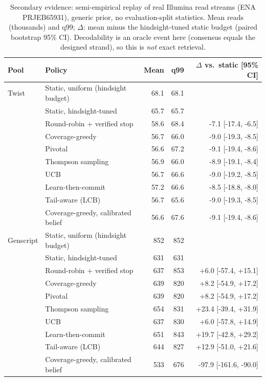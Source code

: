 \begin{table}[!t]
\centering
\caption{Secondary evidence: semi-empirical replay of real Illumina read streams (ENA PRJEB65931), generic prior, no evaluation-split statistics.  Mean reads (thousands) and q99; $\Delta$: mean minus the hindsight-tuned static budget (paired bootstrap 95\% CI).  Decodability is an oracle event here (consensus equals the designed strand), so this is \emph{not} exact retrieval.}
\label{tab:replay}
\scriptsize
\setlength{\tabcolsep}{2.5pt}
\begin{tabular}{@{}llrrr@{}}
\toprule
Pool & Policy & Mean & q99 & $\Delta$ vs.\ static [95\% CI] \\
\midrule
Twist & Static, uniform (hindsight budget) & 68.1 & 68.1 &  \\
 & Static, hindsight-tuned & 65.7 & 65.7 &  \\
 & Round-robin + verified stop & 58.6 & 68.4 & -7.1 [-17.4, -6.5] \\
 & Coverage-greedy & 56.7 & 66.0 & -9.0 [-19.3, -8.5] \\
 & Pivotal & 56.6 & 67.2 & -9.1 [-19.4, -8.6] \\
 & Thompson sampling & 56.9 & 66.0 & -8.9 [-19.1, -8.4] \\
 & UCB & 56.7 & 66.6 & -9.0 [-19.2, -8.5] \\
 & Learn-then-commit & 57.2 & 66.6 & -8.5 [-18.8, -8.0] \\
 & Tail-aware (LCB) & 56.7 & 65.6 & -9.0 [-19.3, -8.5] \\
 & Coverage-greedy, calibrated belief & 56.6 & 67.6 & -9.1 [-19.4, -8.6] \\
\midrule
Genscript & Static, uniform (hindsight budget) & 852 & 852 &  \\
 & Static, hindsight-tuned & 631 & 631 &  \\
 & Round-robin + verified stop & 637 & 853 & +6.0 [-57.4, +15.1] \\
 & Coverage-greedy & 639 & 820 & +8.2 [-54.9, +17.2] \\
 & Pivotal & 639 & 820 & +8.2 [-54.9, +17.2] \\
 & Thompson sampling & 654 & 831 & +23.4 [-39.4, +31.9] \\
 & UCB & 637 & 830 & +6.0 [-57.8, +14.9] \\
 & Learn-then-commit & 651 & 843 & +19.7 [-42.8, +29.2] \\
 & Tail-aware (LCB) & 644 & 827 & +12.9 [-51.0, +21.6] \\
 & Coverage-greedy, calibrated belief & 533 & 676 & -97.9 [-161.6, -90.0] \\
\bottomrule
\end{tabular}
\end{table}
